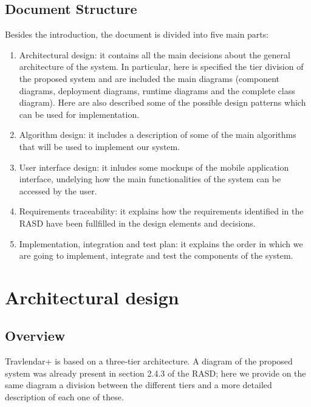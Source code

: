 \documentclass[a4paper,leqno]{article}
\begin{document}
\subsection{Document Structure}
Besides the introduction, the document is divided into five main parts:
\begin{enumerate}
	\item Architectural design: it contains all the main decisions about the general architecture of the system. In particular, here is specified the tier division of the proposed system and are included the main diagrams (component diagrams, deployment diagrams, runtime diagrams and the complete class diagram). Here are also described some of the possible design patterns which can be used for implementation.
	\item Algorithm design: it includes a description of some of the main algorithms that will be used to implement our system.
	\item User interface design: it inludes some mockups of the mobile application interface, undelying how the main functionalities of the system can be accessed by the user.
	\item Requirements traceability: it explains how the requirements identified in the RASD have been fullfilled in the design elements and decisions.
	\item Implementation, integration and test plan: it explains the order in which we are going to implement, integrate and test the components of the system.
\end{enumerate}

\newpage
\section{Architectural design}

\subsection{Overview}
Travlendar+ is based on a three-tier architecture. A diagram of the proposed system was already present in section 2.4.3 of the RASD; here we provide on the same diagram a division between the different tiers and a more detailed description of each one of these.
\end{document}
